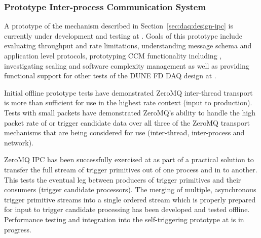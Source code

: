 
\subsubsection{Prototype Inter-process Communication System}

A prototype of the  mechanism described in Section~\ref{sec:daq:design-ipc} is currently under development and testing at .  Goals of this prototype include evaluating throughput and rate limitations, understanding message schema and application level protocols, prototyping CCM functionality including , investigating scaling and software complexity management as well as providing functional support for other tests of the DUNE FD DAQ design at .

Initial offline prototype tests have demonstrated ZeroMQ inter-thread transport is more than sufficient for use in the highest rate  context (input to  production).
Tests with small packets have demonstrated ZeroMQ's ability to handle the high packet rate of  or trigger candidate data over all three of the ZeroMQ transport mechanisms that are being considered for use (inter-thread, inter-process and network).  

ZeroMQ IPC has been successfully exercised at  as part of a practical solution to transfer the full stream of trigger primitives out of one process and in to another. 
This tests the eventual leg between producers of trigger primitives and their consumers (trigger candidate processors). 
The merging of multiple, asynchronous trigger primitive streams into a single ordered stream which is properly prepared for input to trigger candidate processing has been developed and tested offline.  Performance testing and integration into the self-triggering prototype at  is in progress.





